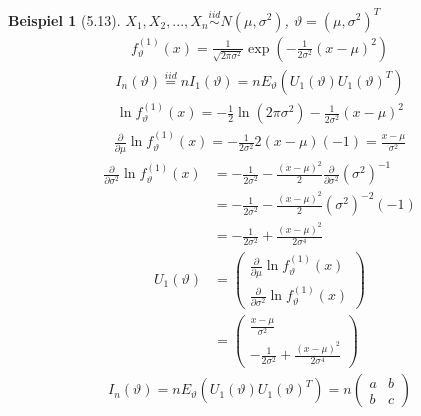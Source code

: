 \documentclass[a4paper,openany]{book}
\theoremstyle{mytheoremstyle}
\newtheorem*{bei}{Beispiel}
\theoremstyle{mytheoremstyle2}
\begin{document}
\begin{bei}[5.13]
  $X_1,X_2,...,X_n \overset{iid}\sim N(\mu ,\sigma ^2)$, $\vartheta =(\mu ,\sigma^2)^T$ \\
  \begin{align*}
    f _{\vartheta }^{(1)}(x)=\frac{1}{\sqrt{2 \pi \sigma ^2}}\exp \left(-\frac{1}{2 \sigma ^2}(x-\mu )^2\right)
  \end{align*}
  \begin{align*}
    I_n(\vartheta )\overset{iid}=n I_1(\vartheta )=n E _{\vartheta }(U_1(\vartheta )U_1(\vartheta )^T)
  \end{align*}
  \begin{align*}
    \ln f _{\vartheta }^{(1)}(x)=-\frac{1}{2}\ln(2 \pi \sigma ^2)-\frac{1}{2 \sigma ^2}(x-\mu )^2
  \end{align*}
  \begin{align*}
    \frac{\partial }{\partial \mu }\ln f _{\vartheta }^{(1)}(x)=-\frac{1}{2 \sigma ^2}2(x-\mu )(-1)=\frac{x-\mu }{\sigma ^2}
  \end{align*}
  \begin{align*}
    \frac{\partial }{\partial \sigma ^2}\ln f _{\vartheta }^{(1)}(x)
    &=-\frac{1}{2 \sigma ^2}-\frac{(x-\mu )^2}{2}\frac{\partial }{\partial \sigma ^2}(\sigma ^2)^{-1}\\
    &=-\frac{1}{2 \sigma ^2}-\frac{(x-\mu )^2}{2}(\sigma ^2)^{-2}(-1) \\
    &=-\frac{1}{2 \sigma ^2}+\frac{(x-\mu )^2}{2 \sigma ^4}
  \end{align*}
  \begin{align*}
    U_1 (\vartheta )
    &=\begin{pmatrix}\frac{\partial }{\partial \mu }\ln f _{\vartheta }^{(1)}(x)\\\frac{\partial }{\partial \sigma ^2 }\ln f _{\vartheta }^{(1)}(x)\end{pmatrix} \\
    &=\begin{pmatrix}\frac{x-\mu }{\sigma ^2}\\-\frac{1}{2 \sigma ^2}+\frac{(x-\mu )^2}{2 \sigma ^4}\end{pmatrix}
  \end{align*}
  \begin{align*}
    I_n(\vartheta )=n E _{\vartheta }(U_1(\vartheta )U_1(\vartheta )^T)=n \begin{pmatrix}
      a &b \\b &c
    \end{pmatrix}
  \end{align*}

\end{bei}
\end{document}
